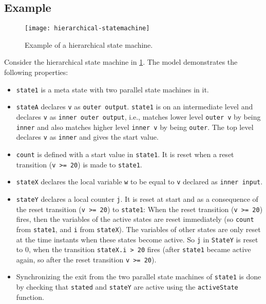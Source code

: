 \subsection{Example}\label{example}

\begin{figure}[H]
  \begin{center}
    \texttt{[image: hierarchical-statemachine]}
  \end{center}
  \caption{Example of a hierarchical state machine.}
  \label{fig:hierarchical-statemachine}
\end{figure}

\begin{example}
Consider the hierarchical state machine in \cref{fig:hierarchical-statemachine}.
The model demonstrates the following properties:
\begin{itemize}
\item
  \lstinline!state1! is a meta state with two parallel state machines in it.
\item
  \lstinline!stateA! declares \lstinline!v! as \lstinline!outer output!.
  \lstinline!state1! is on an intermediate level and declares \lstinline!v! as \lstinline!inner outer output!, i.e., matches lower level \lstinline!outer v! by being \lstinline!inner! and also matches higher level \lstinline!inner v! by being \lstinline!outer!.
  The top level declares \lstinline!v! as \lstinline!inner! and gives the start value.
\item
  \lstinline!count! is defined with a start value in \lstinline!state1!.
  It is reset when a reset transition (\lstinline!v >= 20!) is made to \lstinline!state1!.
\item
  \lstinline!stateX! declares the local variable \lstinline!w! to be equal to \lstinline!v! declared as \lstinline!inner input!.
\item
  \lstinline!stateY! declares a local counter \lstinline!j!.
  It is reset at start and as a consequence of the reset transition (\lstinline!v >= 20!) to \lstinline!state1!: When the reset transition (\lstinline!v >= 20!) fires, then the variables of the active states are reset immediately (so \lstinline!count! from \lstinline!state1!, and \lstinline!i! from \lstinline!stateX!).
  The variables of other states are only reset at the time instants when these states become active.
  So \lstinline!j! in \lstinline!StateY! is reset to 0, when the transition \lstinline!stateX.i > 20! fires (after \lstinline!state1! became active again, so after the reset transition \lstinline!v >= 20!).
\item
  Synchronizing the exit from the two parallel state machines of \lstinline!state1! is done by checking that \lstinline!stated! and \lstinline!stateY! are active using the \lstinline!activeState! function.
\end{itemize}


\end{example}
